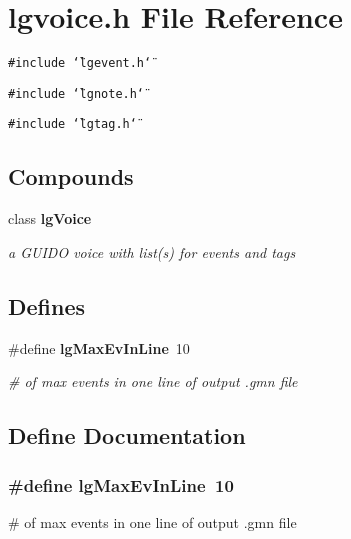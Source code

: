 \section{lgvoice.h File Reference}
\label{lgvoice_8h}
{\tt \#include \char`\"{}lgevent.h\char`\"{}}\par
{\tt \#include \char`\"{}lgnote.h\char`\"{}}\par
{\tt \#include \char`\"{}lgtag.h\char`\"{}}\par
\subsection*{Compounds}
\begin{CompactItemize}
\item 
class {\bf lg\-Voice}
\begin{CompactList}\small\item\em a GUIDO voice with list(s) for events and tags \item\end{CompactList}\end{CompactItemize}
\subsection*{Defines}
\begin{CompactItemize}
\item 
\#define {\bf lg\-Max\-Ev\-In\-Line}\ 10
\begin{CompactList}\small\item\em \# of max events in one line of output .gmn file \item\end{CompactList}\end{CompactItemize}


\subsection{Define Documentation}
\subsubsection{\setlength{\rightskip}{0pt plus 5cm}\#define lg\-Max\-Ev\-In\-Line\ 10}\label{lgvoice_8h_a0}


\# of max events in one line of output .gmn file 

